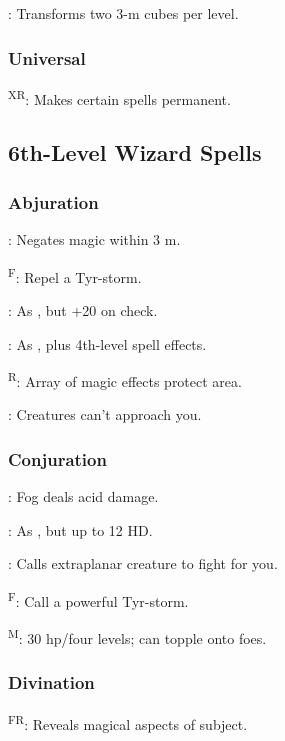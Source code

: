 	: Transforms two 3-m cubes per level.

\subsubsection{Universal}
	\textsuperscript{XR}: Makes certain spells permanent.



\subsection{6th-Level Wizard Spells}

\subsubsection{Abjuration}
	: Negates magic within 3 m.

	\textsuperscript{F}: Repel a Tyr-storm. %

	: As , but +20 on check.

	: As , plus 4th-level spell effects.

	\textsuperscript{R}: Array of magic effects protect area.

	: Creatures can't approach you.

\subsubsection{Conjuration}
	: Fog deals acid damage.

	: As , but up to 12 HD.

	: Calls extraplanar creature to fight for you.

	\textsuperscript{F}: Call a powerful Tyr-storm. %

	\textsuperscript{M}: 30 hp/four levels; can topple onto foes.

\subsubsection{Divination}
	\textsuperscript{FR}: Reveals magical aspects of subject.

